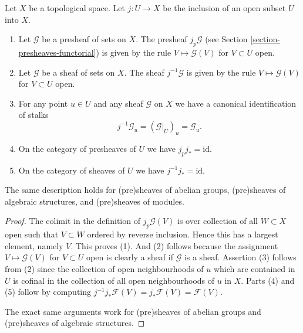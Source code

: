 \begin{lemma}
\label{lemma-j-pullback}
Let $X$ be a topological space.
Let $j : U \to X$ be the inclusion of an open subset $U$ into $X$.
\begin{enumerate}
\item Let $\mathcal{G}$ be a presheaf of sets on $X$.
The presheaf $j_p\mathcal{G}$
(see Section \ref{section-presheaves-functorial}) is given by the rule
$V \mapsto \mathcal{G}(V)$ for $V \subset U$ open.
\item Let $\mathcal{G}$ be a sheaf of sets on $X$.
The sheaf $j^{-1}\mathcal{G}$ is given by the rule
$V \mapsto \mathcal{G}(V)$ for $V \subset U$ open.
\item For any point $u \in U$ and any sheaf $\mathcal{G}$ on $X$
we have a canonical identification of stalks
$$
j^{-1}\mathcal{G}_u = (\mathcal{G}|_U)_u = \mathcal{G}_u.
$$
\item On the category of presheaves of $U$ we have $j_pj_* = \text{id}$.
\item On the category of sheaves of $U$ we have $j^{-1}j_* = \text{id}$.
\end{enumerate}
The same description holds for (pre)sheaves of abelian groups,
(pre)sheaves of algebraic structures, and (pre)sheaves of modules.
\end{lemma}

\begin{proof}
The colimit in the definition of $j_p\mathcal{G}(V)$
is over collection of all $W \subset X$ open such that $V \subset W$
ordered by reverse inclusion.
Hence this has a largest element, namely $V$. This proves (1).
And (2) follows because the assignment $V \mapsto \mathcal{G}(V)$
for $V \subset U$ open is clearly a sheaf if $\mathcal{G}$ is a
sheaf. Assertion (3) follows from (2) since the collection
of open neighbourhoods of $u$ which are contained in $U$ is cofinal
in the collection of all open neighbourhoods of $u$ in $X$.
Parts (4) and (5) follow by computing
$j^{-1}j_*\mathcal{F}(V) = j_*\mathcal{F}(V) = \mathcal{F}(V)$.

\medskip\noindent
The exact same arguments work for (pre)sheaves of abelian groups
and (pre)sheaves of algebraic structures.
\end{proof}

